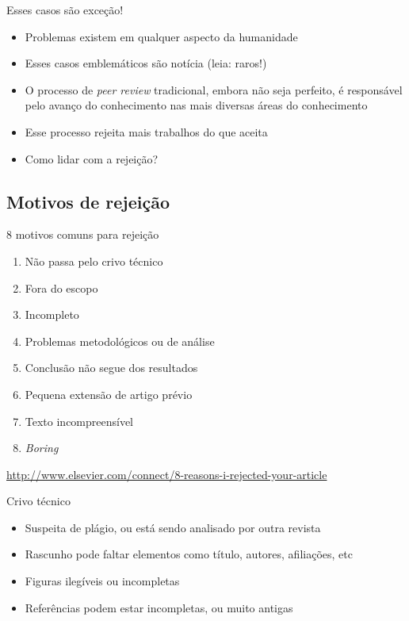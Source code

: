 \documentclass{beamer}
\begin{document}
\begin{frame}{Esses casos são exceção!}
  \begin{itemize}
    \footnotesize
  \item Problemas existem em qualquer aspecto da humanidade
    \medskip
  \item Esses casos emblemáticos são notícia (leia: raros!)
    \medskip
  \item O processo de {\em peer review} tradicional, embora não seja
    perfeito, é responsável pelo avanço do conhecimento nas mais
    diversas áreas do conhecimento
    \medskip
  \item Esse processo rejeita mais trabalhos do que aceita
    \medskip
  \item Como lidar com a rejeição?
  \end{itemize}
\end{frame}

\subsection{Motivos de rejeição}

\begin{frame}{8 motivos comuns para rejeição}
  \begin{enumerate}
    \footnotesize
  \item<1-> Não passa pelo crivo técnico
    \medskip
  \item<1-> Fora do escopo
    \medskip
  \item<1-> Incompleto
    \medskip
  \item<1-> Problemas metodológicos ou de análise
    \medskip
  \item<1-> Conclusão não segue dos resultados
    \medskip
  \item<1-> Pequena extensão de artigo prévio
    \medskip
  \item<1-> Texto incompreensível
    \medskip
  \item<1-> {\em Boring}
  \end{enumerate}

  \vfill
  \tiny
  \hfill \url{http://www.elsevier.com/connect/8-reasons-i-rejected-your-article}
\end{frame}

\begin{frame}{Crivo técnico}
  \begin{itemize}
    \footnotesize
  \item Suspeita de plágio, ou está sendo analisado por outra revista
    \bigskip
  \item Rascunho pode faltar elementos como título, autores,
    afiliações, etc
    \bigskip
  \item Figuras ilegíveis ou incompletas
    \bigskip
  \item Referências podem estar incompletas, ou muito antigas
  \end{itemize}
\end{frame}
\end{document}
